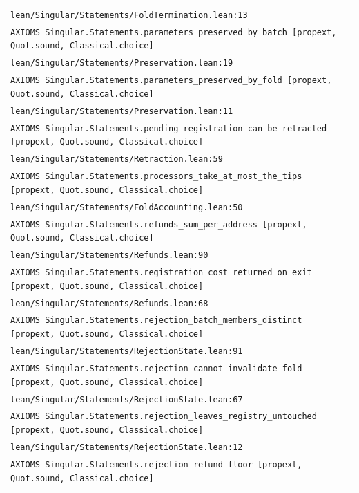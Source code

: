 \begin{longtable}{p{.94\linewidth}}
\nolinkurl{lean/Singular/Statements/FoldTermination.lean:13}\\[5pt]
\texttt{AXIOMS }\nolinkurl{Singular.Statements.parameters_preserved_by_batch}\texttt{ [propext, Quot.sound, Classical.choice]}\\
\nolinkurl{lean/Singular/Statements/Preservation.lean:19}\\[5pt]
\texttt{AXIOMS }\nolinkurl{Singular.Statements.parameters_preserved_by_fold}\texttt{ [propext, Quot.sound, Classical.choice]}\\
\nolinkurl{lean/Singular/Statements/Preservation.lean:11}\\[5pt]
\texttt{AXIOMS }\nolinkurl{Singular.Statements.pending_registration_can_be_retracted}\texttt{ [propext, Quot.sound, Classical.choice]}\\
\nolinkurl{lean/Singular/Statements/Retraction.lean:59}\\[5pt]
\texttt{AXIOMS }\nolinkurl{Singular.Statements.processors_take_at_most_the_tips}\texttt{ [propext, Quot.sound, Classical.choice]}\\
\nolinkurl{lean/Singular/Statements/FoldAccounting.lean:50}\\[5pt]
\texttt{AXIOMS }\nolinkurl{Singular.Statements.refunds_sum_per_address}\texttt{ [propext, Quot.sound, Classical.choice]}\\
\nolinkurl{lean/Singular/Statements/Refunds.lean:90}\\[5pt]
\texttt{AXIOMS }\nolinkurl{Singular.Statements.registration_cost_returned_on_exit}\texttt{ [propext, Quot.sound, Classical.choice]}\\
\nolinkurl{lean/Singular/Statements/Refunds.lean:68}\\[5pt]
\texttt{AXIOMS }\nolinkurl{Singular.Statements.rejection_batch_members_distinct}\texttt{ [propext, Quot.sound, Classical.choice]}\\
\nolinkurl{lean/Singular/Statements/RejectionState.lean:91}\\[5pt]
\texttt{AXIOMS }\nolinkurl{Singular.Statements.rejection_cannot_invalidate_fold}\texttt{ [propext, Quot.sound, Classical.choice]}\\
\nolinkurl{lean/Singular/Statements/RejectionState.lean:67}\\[5pt]
\texttt{AXIOMS }\nolinkurl{Singular.Statements.rejection_leaves_registry_untouched}\texttt{ [propext, Quot.sound, Classical.choice]}\\
\nolinkurl{lean/Singular/Statements/RejectionState.lean:12}\\[5pt]
\texttt{AXIOMS }\nolinkurl{Singular.Statements.rejection_refund_floor}\texttt{ [propext, Quot.sound, Classical.choice]}\\

\end{longtable}
